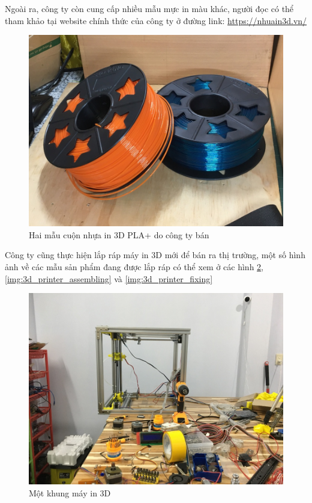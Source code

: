 Ngoài ra, công ty còn cung cấp nhiều mẫu mực in màu khác, người đọc có thể tham khảo tại website chính thức của công ty ở đường link: \url{https://nhuain3d.vn/}

\begin{figure}[!ht]
\centering
\includegraphics[scale=0.4]{images/img_0315_resized.jpg}
\caption{Hai mẫu cuộn nhựa in 3D PLA+ do công ty bán}
\label{img:3d_pla}
\end{figure}

Công ty cũng thực hiện lắp ráp máy in 3D mới để bán ra thị trường, một số hình ảnh về các mẫu sản phẩm đang được lắp ráp có thể xem ở các hình \ref{img:3d_printer_khung}, \ref{img:3d_printer_assembling} và \ref{img:3d_printer_fixing} 

\begin{figure}[!ht]
\centering
\includegraphics[scale=0.4]{images/img_0366_resized.jpg}
\caption{Một khung máy in 3D}
\label{img:3d_printer_khung}
\end{figure}

